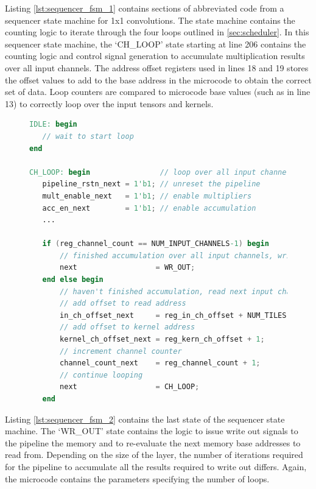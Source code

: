 \documentclass{uw-ece-wkrpt}
\begin{document}
Listing \ref{lst:sequencer_fsm_1} contains sections of abbreviated code from a sequencer state machine for 1x1 convolutions. The state machine contains the counting logic to iterate through the four loops outlined in \ref{sec:scheduler}. In this sequencer state machine, the `CH\_LOOP' state starting at line 206 contains the counting logic and control signal generation to accumulate multiplication results over all input channels. The address offset registers used in lines 18 and 19 stores the offset values to add to the base address in the microcode to obtain the correct set of data. Loop counters are compared to microcode base values (such as in line 13) to correctly loop over the input \glspl{tensor} and \glspl{kernel}.

\begin{figure}
\centering
\begin{lstlisting}[caption={Sequencer state machine part 1}, label=lst:sequencer_fsm_1, language=Verilog, escapechar= numbers=left, firstnumber=201]
IDLE: begin
   // wait to start loop
end

CH_LOOP: begin                // loop over all input channels
   pipeline_rstn_next = 1'b1; // unreset the pipeline
   mult_enable_next   = 1'b1; // enable multipliers
   acc_en_next        = 1'b1; // enable accumulation
   ...

   if (reg_channel_count == NUM_INPUT_CHANNELS-1) begin
       // finished accumulation over all input channels, write out current tile
       next                  = WR_OUT;
   end else begin
       // haven't finished accumulation, read next input channel to accumulate
       // add offset to read address
       in_ch_offset_next     = reg_in_ch_offset + NUM_TILES;
       // add offset to kernel address
       kernel_ch_offset_next = reg_kern_ch_offset + 1;
       // increment channel counter
       channel_count_next    = reg_channel_count + 1;
       // continue looping
       next                  = CH_LOOP;
   end
\end{lstlisting}
\end{figure}

Listing \ref{lst:sequencer_fsm_2} contains the last state of the sequencer state machine. The `WR\_OUT' state contains the logic to issue write out signals to the pipeline the memory and to re-evaluate the next memory base addresses to read from. Depending on the size of the layer, the number of iterations required for the pipeline to accumulate all the results required to write out differs. Again, the microcode contains the parameters specifying the number of loops.
\end{document}
